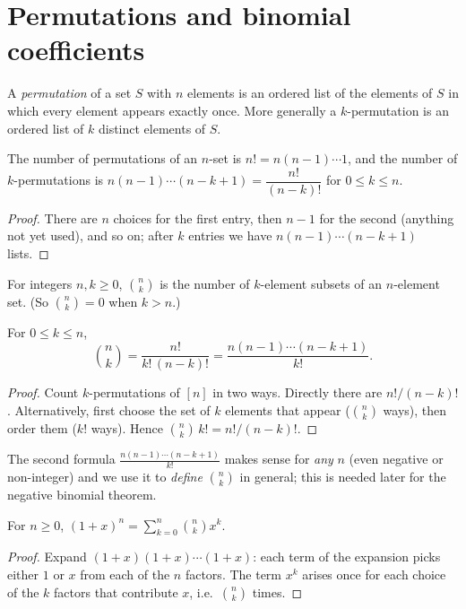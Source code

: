\section{Permutations and binomial coefficients}

\begin{definition}[Permutation]
A \emph{permutation} of a set $S$ with $n$ elements is an ordered list of the elements of $S$
in which every element appears exactly once. More generally a $k$-permutation is an ordered
list of $k$ distinct elements of $S$.
\end{definition}

\begin{proposition}
The number of permutations of an $n$-set is $n! = n(n-1)\cdots 1$, and the number of
$k$-permutations is $n(n-1)\cdots(n-k+1) = \dfrac{n!}{(n-k)!}$ for $0 \le k \le n$.
\end{proposition}
\begin{proof}
There are $n$ choices for the first entry, then $n-1$ for the second (anything not yet used),
and so on; after $k$ entries we have $n(n-1)\cdots(n-k+1)$ lists.
\end{proof}

\begin{definition}
For integers $n, k \ge 0$, $\binom{n}{k}$ is the number of $k$-element subsets of an $n$-element
set. (So $\binom{n}{k} = 0$ when $k > n$.)
\end{definition}

\begin{theorem}
For $0 \le k \le n$,
\[
\binom{n}{k} = \frac{n!}{k!\,(n-k)!} = \frac{n(n-1)\cdots(n-k+1)}{k!}.
\]
\end{theorem}
\begin{proof}
Count $k$-permutations of $[n]$ in two ways. Directly there are $n!/(n-k)!$. Alternatively,
first choose the set of $k$ elements that appear ($\binom{n}{k}$ ways), then order them
($k!$ ways). Hence $\binom{n}{k}\, k! = n!/(n-k)!$.
\end{proof}

The second formula $\frac{n(n-1)\cdots(n-k+1)}{k!}$ makes sense for \emph{any} $n$ (even
negative or non-integer) and we use it to \emph{define} $\binom{n}{k}$ in general; this is
needed later for the negative binomial theorem.

\begin{theorem}
For $n \ge 0$, $\displaystyle (1+x)^n = \sum_{k=0}^{n} \binom{n}{k} x^k$.
\end{theorem}
\begin{proof}
Expand $(1+x)(1+x)\cdots(1+x)$: each term of the expansion picks either $1$ or $x$ from each of
the $n$ factors. The term $x^k$ arises once for each choice of the $k$ factors that contribute
$x$, i.e.\ $\binom{n}{k}$ times.
\end{proof}

